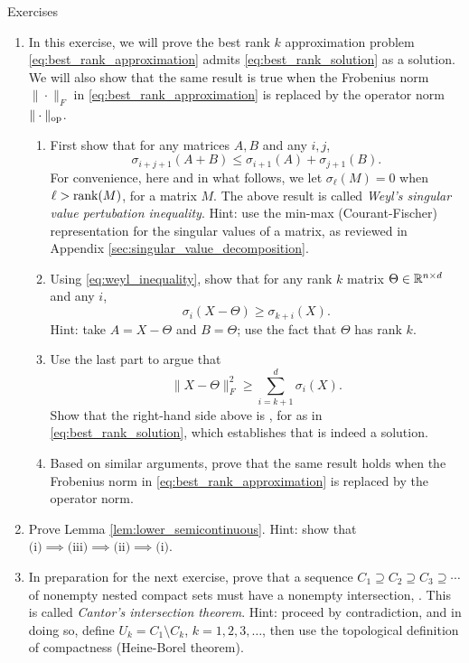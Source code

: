 \begin{xcb}{Exercises}
\begin{enumerate}[label=\thechapter.\arabic*]
\item In this exercise, we will prove the best rank $k$ approximation problem 
  \eqref{eq:best_rank_approximation} admits \eqref{eq:best_rank_solution} as a
  solution. We will also show that the same result is true when the Frobenius
  norm $\|\cdot\|_F$ in \eqref{eq:best_rank_approximation} is replaced by the 
  operator norm $\|\cdot\|_{\mathrm{op}}$. 

\begin{enumerate}[label=\alph*.]
\item First show that for any matrices $A,B$ and any $i,j$,
  \begin{equation}
  \label{eq:weyl_inequality}
  \sigma_{i+j+1}(A+B) \leq \sigma_{i+1}(A) + \sigma_{j+1}(B).
  \end{equation}
  For convenience, here and in what follows, we let $\sigma_\ell(M) = 0$ when   
  $\ell > \operatorname{rank}(M)$, for a matrix $M$. The above result is called \emph{Weyl's  
    singular value pertubation inequality}. Hint: use the min-max
  (Courant-Fischer) representation for the singular values of a matrix, as
  reviewed in Appendix \ref{sec:singular_value_decomposition}.

\item Using \eqref{eq:weyl_inequality}, show that for any rank $k$ matrix
  $\Theta \in \mathbb{R}^{n \times d}$ and any $i$, 
  \[
  \sigma_i(X - \Theta) \geq \sigma_{k+i}(X).
  \]
  Hint: take $A = X-\Theta$ and $B = \Theta$; use the fact that $\Theta$ has
  rank $k$. 

  \item Use the last part to argue that
  \[
  \|X - \Theta\|_F^2 \geq \sum_{i=k+1}^d \sigma_i(X).
  \]
  Show that the right-hand side above is , for
  \smash{$\hat\Theta$} as in \eqref{eq:best_rank_solution}, which establishes
  that \smash{$\hat\Theta$} is indeed a solution. 

\item Based on similar arguments, prove that the same result holds when the
  Frobenius norm in \eqref{eq:best_rank_approximation} is replaced by the
  operator norm. 
\end{enumerate}

\item Prove Lemma \ref{lem:lower_semicontinuous}. Hint: show that $\text{(i)}
    \implies \text{(iii)} \implies \text{(ii)} \implies \text{(i)}$.

\item \label{ex:cantor_intersection} 
  In preparation for the next exercise, prove that a sequence $C_1 \supseteq
  C_2 \supseteq C_3 \supseteq \cdots$ of nonempty nested compact sets must
  have a nonempty intersection, . This is called \emph{Cantor's intersection theorem}. Hint:
  proceed by contradiction, and in doing so, define $U_k =  C_1 \setminus C_k$,
  $k=1,2,3,\dots$, then use the topological definition of compactness
  (Heine-Borel theorem).        


\end{enumerate}
\end{xcb}
